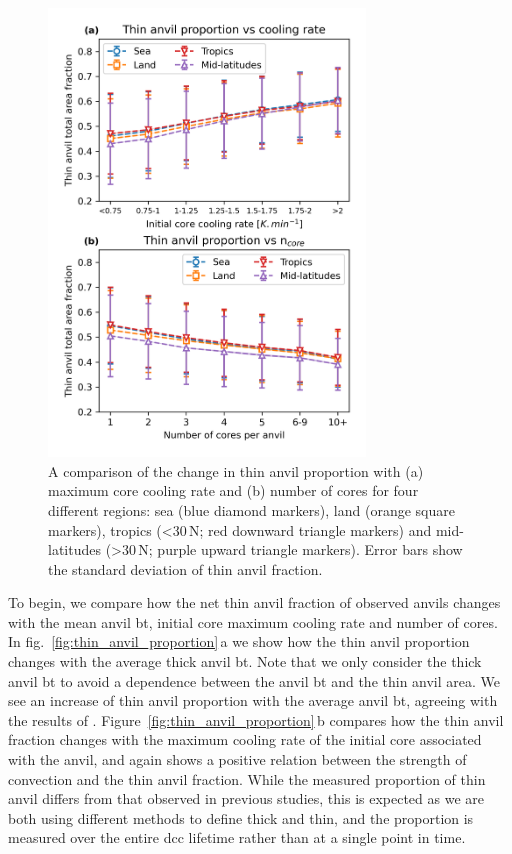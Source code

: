 \begin{figure}[tp]
    \centering
    \includegraphics[width=0.75\textwidth]{figures/chapter3_05.png}
    \caption[
    A comparison of the change in thin anvil proportion with maximum core cooling rate and number of cores for four different regions
    ]{
    A comparison of the change in thin anvil proportion with (a) maximum core cooling rate and (b) number of cores for four different regions: sea (blue diamond markers), land (orange square markers), tropics (\textless 30\,\textdegree N; red downward triangle markers) and mid-latitudes (\textgreater 30\,\textdegree N; purple upward triangle markers). Error bars show the standard deviation of thin anvil fraction.
    }
    \label{fig:regional_thin_anvil_proportion}
\end{figure}

To begin, we compare how the net thin anvil fraction of observed anvils changes with the mean anvil \acrshort{bt}, initial core maximum cooling rate and number of cores.
In fig.~\ref{fig:thin_anvil_proportion}\,a we show how the thin anvil proportion changes with the average thick anvil \acrshort{bt}.
Note that we only consider the thick anvil \acrshort{bt} to avoid a dependence between the anvil \acrshort{bt} and the thin anvil area.
We see an increase of thin anvil proportion with the average anvil \acrshort{bt}, agreeing with the results of \citet{protopapadaki_upper_2017}.
Figure~\ref{fig:thin_anvil_proportion}\,b compares how the thin anvil fraction changes with the maximum cooling rate of the initial core associated with the anvil, and again shows a positive relation between the strength of convection and the thin anvil fraction.
While the measured proportion of thin anvil differs from that observed in previous studies, this is expected as we are both using different methods to define thick and thin, and the proportion is measured over the entire \acrshort{dcc} lifetime rather than at a single point in time.

